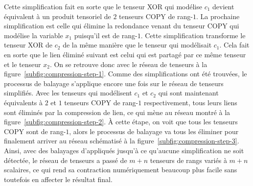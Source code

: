 Cette simplification fait en sorte que le tenseur XOR qui modélise $c_1$ devient équivalent à un produit tensoriel de $2$ tenseurs COPY de rang-$1$.
La prochaine simplification est celle qui élimine la redondance venant du tenseur COPY qui modélise la variable $x_1$ puisqu'il est de rang-$1$.
Cette simplification transforme le tenseur XOR de $c_2$ de la même manière que le tenseur qui modélisait $c_1$.
Cela fait en sorte que le lien éliminé suivant est celui qui est partagé par ce même tenseur et le tenseur $x_2$.
On se retrouve donc avec le réseau de tenseurs à la figure~\ref{subfig:compression-step-1}.
Comme des simplifications ont été trouvées, le processus de balayage s'applique encore une fois sur le réseau de tenseurs simplifiés.
Avec les tenseurs qui modélisent $c_1$ et $c_2$ qui sont maintenant équivalents à $2$ et $1$ tenseurs COPY de rang-$1$ respectivement, tous leurs liens sont éliminés par la compression de lien, ce qui mène au réseau montré à la figure~\ref{subfig:compression-step-2}.
À cette étape, on voit que tous les tenseurs COPY sont de rang-$1$, alors le processus de balayage va tous les éliminer pour finalement arriver au réseau schématisé à la figure~\ref{subfig:compression-step-3}.
Ainsi, avec des balayages d'appliqués jusqu'à ce qu'aucune simplification ne soit détectée, le réseau de tenseurs a passé de $m + n$ tenseurs de rangs variés à $m + n$ scalaires, ce qui rend sa contraction numériquement beaucoup plus facile sans toutefois en affecter le résultat final.

